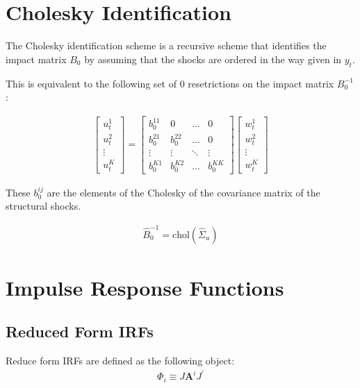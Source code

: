 \documentclass{article}
\begin{document}
\section{Cholesky Identification}

The Cholesky identification scheme is a recursive scheme that identifies the impact matrix $B_0$ by assuming that the shocks are ordered in the way given in $y_t$.

This is equivalent to the following set of 0 resetrictions on the impact matrix $B_0^{-1}$:

\begin{align*}
  \begin{bmatrix} u_t^1 \\ u_t^2 \\ \vdots \\ u_t^K \end{bmatrix}
  =
  \begin{bmatrix}
    b_0^{11} & 0 & \dots & 0 \\
    b_0^{21} & b_0^{22} & \dots & 0 \\
    \vdots & \vdots & \ddots & \vdots \\
    b_0^{K1} & b_0^{K2} & \dots & b_0^{KK}
  \end{bmatrix}
  \begin{bmatrix} w_t^1 \\ w_t^2 \\ \vdots \\ w_t^K \end{bmatrix}
\end{align*}

These $b_0^{ij}$ are the elements of the Cholesky of the covariance matrix of the structural shocks.

\begin{align*}
  \widehat{B}_0^{-1} = \text{chol} (\widehat{\Sigma}_u)
\end{align*}

\section{Impulse Response Functions}

\subsection{Reduced Form IRFs}

Reduce form IRFs are defined as the following object:
\begin{align*}
  \Phi_i \equiv J \mathbf{A}^i J^\prime
\end{align*}
\end{document}
